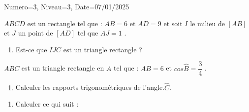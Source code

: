 \documentclass[a4paper,12pt]{article}
\begin{document}
\begin{Maquette}[DS]{Numero=3, Niveau=3, Date=07/01/2025}


\begin{exercice}[BaremeDetaille]
$ABCD$ est un rectangle tel que : $AB=6 $ et  $AD=9 $ et soit  $I$ le milieu de $[AB]$ et $J$ un point de  $[AD]$ tel que $AJ=1 $ .
\begin{enumerate}
\item{} Est-ce que  $IJC$ est un triangle rectangle ?
\end{enumerate}
\anserline[5]
\end{exercice}

\begin{exercice}[BaremeDetaille]
$ABC$ est un triangle rectangle en $A$ tel que : $AB=6$ et $cos\widehat{B}=\dfrac{3}{4}$ .
\begin{enumerate}
%
%
\item{} Calculer les rapports trigonométriques de l'angle.$\widehat{C}$.\newline
\anserline[5]
\end{enumerate}
\end{exercice}

\begin{exercice}[BaremeDetaille]
\begin{enumerate}
\item{} Calculer ce qui suit :


\end{enumerate}
\end{exercice}
\end{Maquette}
\end{document}
